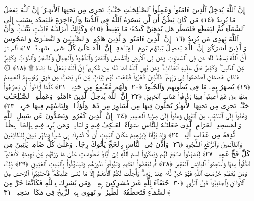  إِنَّ ٱللَّهَ يُدخِلُ ٱلَّذِينَ ءَامَنُوا۟ وَعَمِلُوا۟ ٱلصَّـٰلِحَـٰتِ جَنَّـٰتٍۢ تَجرِى مِن تَحتِهَا ٱلأَنهَـٰرُ ۚ إِنَّ ٱللَّهَ يَفعَلُ مَا يُرِيدُ ﴿١٤﴾
 مَن كَانَ يَظُنُّ أَن لَّن يَنصُرَهُ ٱللَّهُ فِى ٱلدُّنيَا وَٱلءَاخِرَةِ فَليَمدُد بِسَبَبٍ إِلَى ٱلسَّمَآءِ ثُمَّ ليَقطَع فَليَنظُر هَل يُذهِبَنَّ كَيدُهُۥ مَا يَغِيظُ ﴿١٥﴾
 وَكَذَٟلِكَ أَنزَلنَـٰهُ ءَايَـٰتٍۭ بَيِّنَـٰتٍۢ وَأَنَّ ٱللَّهَ يَهدِى مَن يُرِيدُ ﴿١٦﴾
 إِنَّ ٱلَّذِينَ ءَامَنُوا۟ وَٱلَّذِينَ هَادُوا۟ وَٱلصَّـٰبِـِٔينَ وَٱلنَّصَـٰرَىٰ وَٱلمَجُوسَ وَٱلَّذِينَ أَشرَكُوٓا۟ إِنَّ ٱللَّهَ يَفصِلُ بَينَهُم يَومَ ٱلقِيَـٰمَةِ ۚ إِنَّ ٱللَّهَ عَلَىٰ كُلِّ شَىءٍۢ شَهِيدٌ ﴿١٧﴾
 أَلَم تَرَ أَنَّ ٱللَّهَ يَسجُدُ لَهُۥ مَن فِى ٱلسَّمَـٰوَٟتِ وَمَن فِى ٱلأَرضِ وَٱلشَّمسُ وَٱلقَمَرُ وَٱلنُّجُومُ وَٱلجِبَالُ وَٱلشَّجَرُ وَٱلدَّوَآبُّ وَكَثِيرٌۭ مِّنَ ٱلنَّاسِ ۖ وَكَثِيرٌ حَقَّ عَلَيهِ ٱلعَذَابُ ۗ وَمَن يُهِنِ ٱللَّهُ فَمَا لَهُۥ مِن مُّكرِمٍ ۚ إِنَّ ٱللَّهَ يَفعَلُ مَا يَشَآءُ ۩ ﴿١٨﴾
 ۞ هَـٰذَانِ خَصمَانِ ٱختَصَمُوا۟ فِى رَبِّهِم ۖ فَٱلَّذِينَ كَفَرُوا۟ قُطِّعَت لَهُم ثِيَابٌۭ مِّن نَّارٍۢ يُصَبُّ مِن فَوقِ رُءُوسِهِمُ ٱلحَمِيمُ ﴿١٩﴾
 يُصهَرُ بِهِۦ مَا فِى بُطُونِهِم وَٱلجُلُودُ ﴿٢٠﴾
 وَلَهُم مَّقَـٰمِعُ مِن حَدِيدٍۢ ﴿٢١﴾
 كُلَّمَآ أَرَادُوٓا۟ أَن يَخرُجُوا۟ مِنهَا مِن غَمٍّ أُعِيدُوا۟ فِيهَا وَذُوقُوا۟ عَذَابَ ٱلحَرِيقِ ﴿٢٢﴾
 إِنَّ ٱللَّهَ يُدخِلُ ٱلَّذِينَ ءَامَنُوا۟ وَعَمِلُوا۟ ٱلصَّـٰلِحَـٰتِ جَنَّـٰتٍۢ تَجرِى مِن تَحتِهَا ٱلأَنهَـٰرُ يُحَلَّونَ فِيهَا مِن أَسَاوِرَ مِن ذَهَبٍۢ وَلُؤلُؤًۭا ۖ وَلِبَاسُهُم فِيهَا حَرِيرٌۭ ﴿٢٣﴾
 وَهُدُوٓا۟ إِلَى ٱلطَّيِّبِ مِنَ ٱلقَولِ وَهُدُوٓا۟ إِلَىٰ صِرَٰطِ ٱلحَمِيدِ ﴿٢٤﴾
 إِنَّ ٱلَّذِينَ كَفَرُوا۟ وَيَصُدُّونَ عَن سَبِيلِ ٱللَّهِ وَٱلمَسجِدِ ٱلحَرَامِ ٱلَّذِى جَعَلنَـٰهُ لِلنَّاسِ سَوَآءً ٱلعَـٰكِفُ فِيهِ وَٱلبَادِ ۚ وَمَن يُرِد فِيهِ بِإِلحَادٍۭ بِظُلمٍۢ نُّذِقهُ مِن عَذَابٍ أَلِيمٍۢ ﴿٢٥﴾
 وَإِذ بَوَّأنَا لِإِبرَٰهِيمَ مَكَانَ ٱلبَيتِ أَن لَّا تُشرِك بِى شَيـًۭٔا وَطَهِّر بَيتِىَ لِلطَّآئِفِينَ وَٱلقَآئِمِينَ وَٱلرُّكَّعِ ٱلسُّجُودِ ﴿٢٦﴾
 وَأَذِّن فِى ٱلنَّاسِ بِٱلحَجِّ يَأتُوكَ رِجَالًۭا وَعَلَىٰ كُلِّ ضَامِرٍۢ يَأتِينَ مِن كُلِّ فَجٍّ عَمِيقٍۢ ﴿٢٧﴾
 لِّيَشهَدُوا۟ مَنَـٰفِعَ لَهُم وَيَذكُرُوا۟ ٱسمَ ٱللَّهِ فِىٓ أَيَّامٍۢ مَّعلُومَـٰتٍ عَلَىٰ مَا رَزَقَهُم مِّنۢ بَهِيمَةِ ٱلأَنعَـٰمِ ۖ فَكُلُوا۟ مِنهَا وَأَطعِمُوا۟ ٱلبَآئِسَ ٱلفَقِيرَ ﴿٢٨﴾
 ثُمَّ ليَقضُوا۟ تَفَثَهُم وَليُوفُوا۟ نُذُورَهُم وَليَطَّوَّفُوا۟ بِٱلبَيتِ ٱلعَتِيقِ ﴿٢٩﴾
 ذَٟلِكَ وَمَن يُعَظِّم حُرُمَـٰتِ ٱللَّهِ فَهُوَ خَيرٌۭ لَّهُۥ عِندَ رَبِّهِۦ ۗ وَأُحِلَّت لَكُمُ ٱلأَنعَـٰمُ إِلَّا مَا يُتلَىٰ عَلَيكُم ۖ فَٱجتَنِبُوا۟ ٱلرِّجسَ مِنَ ٱلأَوثَـٰنِ وَٱجتَنِبُوا۟ قَولَ ٱلزُّورِ ﴿٣٠﴾
 حُنَفَآءَ لِلَّهِ غَيرَ مُشرِكِينَ بِهِۦ ۚ وَمَن يُشرِك بِٱللَّهِ فَكَأَنَّمَا خَرَّ مِنَ ٱلسَّمَآءِ فَتَخطَفُهُ ٱلطَّيرُ أَو تَهوِى بِهِ ٱلرِّيحُ فِى مَكَانٍۢ سَحِيقٍۢ ﴿٣١﴾
